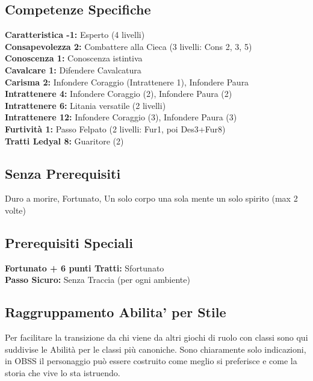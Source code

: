 \begin{multicols}{2}
	\subsection{Competenze Specifiche}
	\textbf{Caratteristica -1:} Esperto (4 livelli)\\
	\textbf{Consapevolezza 2:} Combattere alla Cieca (3 livelli: Cons 2, 3, 5)\\
	\textbf{Conoscenza 1:} Conoscenza istintiva\\
	\textbf{Cavalcare 1:} Difendere Cavalcatura\\
	\textbf{Carisma 2:} Infondere Coraggio (Intrattenere 1), Infondere Paura\\
	\textbf{Intrattenere 4:} Infondere Coraggio (2), Infondere Paura (2)\\
	\textbf{Intrattenere 6:} Litania versatile (2 livelli)\\
	\textbf{Intrattenere 12:} Infondere Coraggio (3), Infondere Paura (3)\\
	\textbf{Furtività 1:} Passo Felpato (2 livelli: Fur1, poi Des3+Fur8)\\
	\textbf{Tratti Ledyal 8:} Guaritore (2)\\

	\subsection{Senza Prerequisiti}
	Duro a morire, Fortunato, Un solo corpo una sola mente un solo spirito (max 2 volte)\\

	\subsection{Prerequisiti Speciali}
	\textbf{Fortunato + 6 punti Tratti:} Sfortunato\\
	\textbf{Passo Sicuro:} Senza Traccia (per ogni ambiente)\\


\end{multicols}


\pagebreak

\subsection{Raggruppamento Abilita' per Stile}

Per facilitare la transizione da chi viene da altri giochi di ruolo con classi sono qui suddivise le Abilità per le classi più canoniche. Sono chiaramente solo indicazioni, in OBSS il personaggio può essere costruito come meglio si preferisce e come la storia che vive lo sta istruendo.

